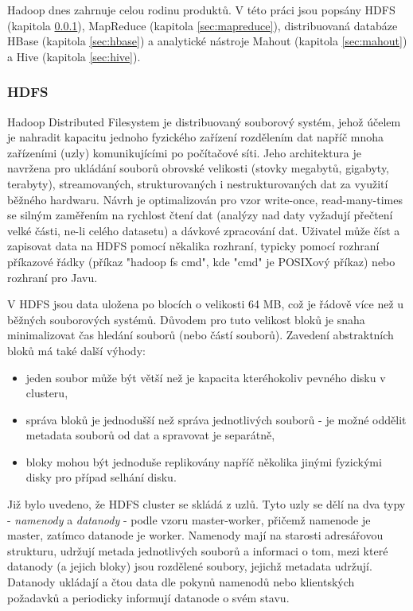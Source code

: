 \documentclass[11pt,twoside,a4paper]{book}
\begin{document}
		Hadoop dnes zahrnuje celou rodinu produktů. V této práci jsou popsány HDFS (kapitola \ref{sec:hdfs}), MapReduce (kapitola \ref{sec:mapreduce}), distribuovaná databáze HBase (kapitola \ref{sec:hbase}) a analytické nástroje Mahout (kapitola \ref{sec:mahout}) a Hive (kapitola \ref{sec:hive}).

		\subsubsection{HDFS}  \label{sec:hdfs}
		Hadoop Distributed Filesystem je distribuovaný souborový systém, jehož účelem je nahradit kapacitu jednoho fyzického zařízení rozdělením dat napříč mnoha zařízeními (uzly) komunikujícími po počítačové síti. Jeho architektura je navržena pro ukládání souborů obrovské velikosti (stovky megabytů, gigabyty, terabyty), streamovaných, strukturovaných i nestrukturovaných dat za využití běžného hardwaru. Návrh je optimalizován pro  vzor write-once, read-many-times se silným zaměřením na rychlost čtení dat (analýzy nad daty vyžadují přečtení velké části, ne-li celého datasetu) a dávkové zpracování dat. Uživatel může číst a zapisovat data na HDFS pomocí někalika rozhraní, typicky pomocí rozhraní příkazové řádky (příkaz "hadoop fs cmd", kde "cmd" je POSIXový příkaz) nebo rozhraní pro Javu. \cite{white01}
			
		V HDFS jsou data uložena po blocích o velikosti 64 MB, což je řádově více než u běžných souborových systémů. Důvodem pro tuto velikost bloků je snaha minimalizovat čas hledání souborů (nebo částí souborů). Zavedení abstraktních bloků má také další výhody:   
\begin{itemize}  
\item jeden soubor může být větší než je kapacita kteréhokoliv pevného disku v clusteru,
\item správa bloků je jednodušší než správa jednotlivých souborů - je možné oddělit metadata souborů od dat a spravovat je separátně,
\item bloky mohou být jednoduše replikovány napříč několika jinými fyzickými disky pro případ selhání disku.
\end{itemize}

		Již bylo uvedeno, že HDFS cluster se skládá z uzlů. Tyto uzly se dělí na dva typy - \textit{namenody} a \textit{datanody} - podle vzoru master-worker, přičemž namenode je master, zatímco datanode je worker. Namenody mají na starosti adresářovou strukturu, udržují metada jednotlivých souborů a informaci o tom, mezi které datanody (a jejich bloky) jsou rozdělené soubory, jejichž metadata udržují. Datanody ukládají a čtou data dle pokynů namenodů nebo klientských požadavků a periodicky informují datanode o svém stavu. 
\end{document}
